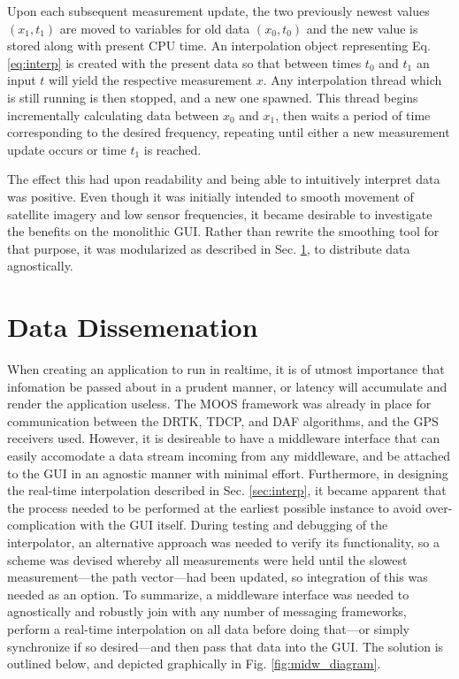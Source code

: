 Upon each subsequent measurement update, the two previously newest values $(x_1,t_1)$ are moved to variables for old data $(x_0, t_0)$ and the new value is stored along with present CPU time. An interpolation object representing Eq. \eqref{eq:interp} is created with the present data so that between times $t_0$ and $t_1$ an input $t$ will yield the respective measurement $x$. Any interpolation thread which is still running is then stopped, and a new one spawned. This thread begins incrementally calculating data between $x_0$ and $x_1$, then waits a period of time corresponding to the desired frequency, repeating until either a new measurement update occurs or time $t_1$ is reached.

The effect this had upon readability and being able to intuitively interpret data was positive. Even though it was initially intended to smooth movement of satellite imagery and low sensor frequencies, it became desirable to investigate the benefits on the monolithic GUI. Rather than rewrite the smoothing tool for that purpose, it was modularized as described in Sec. \ref{sec:datadiss}, to distribute data agnostically.

\section{Data Dissemenation} \label{sec:datadiss}

When creating an application to run in realtime, it is of utmost importance that infomation be passed about in a prudent manner, or latency will accumulate and render the application  useless. The MOOS framework \cite{moos} was already in place for communication between the DRTK, TDCP, and DAF algorithms, and the GPS receivers used. However, it is desireable to have a middleware interface that can easily accomodate a data stream incoming from any middleware, and be attached to the GUI in an agnostic manner with minimal effort. Furthermore, in designing the real-time interpolation described in Sec. \ref{sec:interp}, it became apparent that the process needed to be performed at the earliest possible instance to avoid over-complication with the GUI itself. During testing and debugging of the interpolator, an alternative approach was needed to verify its functionality, so a scheme was devised whereby all measurements were held until the slowest measurement---the path vector---had been updated, so integration of this was needed as an option. To summarize, a middleware interface was needed to agnostically and robustly join with any number of messaging frameworks, perform a real-time interpolation on all data before doing that---or simply synchronize if so desired---and then pass that data into the GUI. The solution is outlined below, and depicted graphically in Fig. \ref{fig:midw_diagram}.

